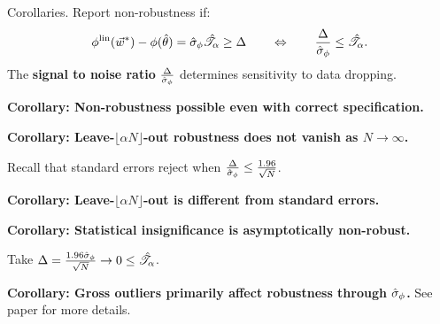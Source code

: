 \begin{frame}[t]{Corollaries.}
%
Report non-robustness if:
%
\begin{align*}
%
\thetafunlin(\w^*) - \thetafun(\thetahat)  = \noise \shape \ge \Delta
\quad\quad
\Leftrightarrow
\quad\quad
\frac{\Delta}{\noise} \le \shape.
%
\end{align*}
%
The \textbf{signal to noise ratio} $\frac{\Delta}{\hat\sigma_{\phi}}$
determines sensitivity to data dropping.


\hrulefill


\pause
\vspace{0.5em}
\textbf{Corollary:  Non-robustness possible even with correct specification.}

\pause
\vspace{0.5em}
\textbf{Corollary:  Leave-$\lfloor \alpha N \rfloor$-out robustness does not vanish as $N \rightarrow \infty$.}
%

\pause
\vspace{0.5em}
Recall that standard errors reject when
$\frac{\Delta}{\hat\sigma_{\phi}} \le \frac{1.96}{\sqrt{N}}$.

\pause
\vspace{0.5em}
\textbf{Corollary:  Leave-$\lfloor \alpha N \rfloor$-out is different from standard errors.}

\pause
\vspace{0.5em}
\textbf{Corollary:  Statistical insignificance is asymptotically non-robust.}

Take $\Delta = \frac{1.96 \hat \sigma_\phi}{\sqrt{N}} \rightarrow 0 \le
\hat{\mathscr{T}}_\alpha$.

\pause
\vspace{0.5em}
\textbf{Corollary:  Gross outliers primarily affect robustness
through $\hat\sigma_{\phi}$.}
See paper for more details.

\end{frame}
